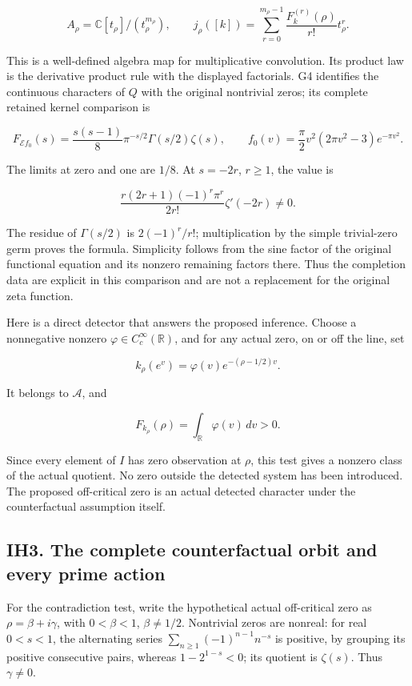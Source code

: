 \[
A_\rho=\mathbb C[t_\rho]/(t_\rho^{m_\rho}),\qquad
j_\rho([k])=\sum_{r=0}^{m_\rho-1}\frac{F_k^{(r)}(\rho)}{r!}t_\rho^r.
\tag{IH2.3}
\]

This is a well-defined algebra map for multiplicative convolution. Its
product law is the derivative product rule with the displayed
factorials. G4 identifies the continuous characters of \(Q\) with the
original nontrivial zeros; its complete retained kernel comparison is

\[
F_{\mathcal E f_0}(s)=\frac{s(s-1)}8\pi^{-s/2}\Gamma(s/2)\zeta(s),
\qquad f_0(v)=\frac\pi2v^2(2\pi v^2-3)e^{-\pi v^2}.
\tag{IH2.4}
\]

The limits at zero and one are \(1/8\). At \(s=-2r\), \(r\ge1\), the
value is

\[
\frac{r(2r+1)(-1)^r\pi^r}{2r!}\zeta'(-2r)\ne0.
\tag{IH2.5}
\]

The residue of \(\Gamma(s/2)\) is \(2(-1)^r/r!\); multiplication by the
simple trivial-zero germ proves the formula. Simplicity follows from the
sine factor of the original functional equation and its nonzero
remaining factors there. Thus the completion data are explicit in this
comparison and are not a replacement for the original zeta function.

Here is a direct detector that answers the proposed inference. Choose a
nonnegative nonzero \(\varphi\in C_c^\infty(\mathbb R)\), and for any
actual zero, on or off the line, set

\[
k_\rho(e^v)=\varphi(v)e^{-(\rho-1/2)v}.
\]

It belongs to \(\mathcal A\), and

\[
F_{k_\rho}(\rho)=\int_{\mathbb R}\varphi(v)\,dv>0.
\tag{IH2.6}
\]

Since every element of \(I\) has zero observation at \(\rho\), this test
gives a nonzero class of the actual quotient. No zero outside the
detected system has been introduced. The proposed off-critical zero is
an actual detected character under the counterfactual assumption itself.

\subsection{IH3. The complete counterfactual orbit and every prime
action}\label{ih3.-the-complete-counterfactual-orbit-and-every-prime-action}

For the contradiction test, write the hypothetical actual off-critical
zero as \(\rho=\beta+i\gamma\), with \(0<\beta<1\), \(\beta\ne1/2\).
Nontrivial zeros are nonreal: for real \(0<s<1\), the alternating series
\(\sum_{n\ge1}(-1)^{n-1}n^{-s}\) is positive, by grouping its positive
consecutive pairs, whereas \(1-2^{1-s}<0\); its quotient is
\(\zeta(s)\). Thus \(\gamma\ne0\).

